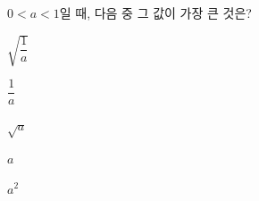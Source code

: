 $0<a<1$일 때, 다음 중 그 값이 가장 큰 것은?
\begin{choices32}{\rule[-3ex]{0pt}{8ex}$\sqrt{\dfrac{1}{a}}$}{\rule[-3ex]{0pt}{8ex}$\dfrac{1}{a}$}{\rule[-3ex]{0pt}{8ex}$\sqrt{a}$}{\rule[-3ex]{0pt}{8ex}$a$}{\rule[-3ex]{0pt}{8ex}$a^2$}\end{choices32}
